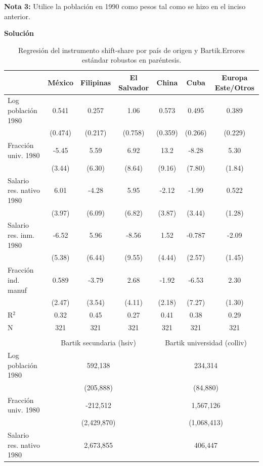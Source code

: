 \documentclass[a4paper, answers, addpoints, 11pt]{exam}
\newenvironment{solucion}{%
  \begin{mdframed}[
    backgroundcolor=blue!5,    %
    linecolor=blue!50,          %
    linewidth=2pt,              %
    leftmargin=10pt,            %
    rightmargin=8pt,           %
    topline=true,              %
    bottomline=true,            %
    roundcorner=10pt,           %
    innerleftmargin=10pt,       %
    innerrightmargin=10pt,      %
    innerbottommargin=10pt,     %
    innertopmargin=10pt         %
  ]%
  \begin{tcolorbox}[colframe=blue!50!black, colback=blue!50, coltitle=white, sharp corners=all, boxrule=1mm, width=\textwidth, halign=left, valign=center, top=0mm, bottom=0mm, left=0mm, right=0mm] \textbf{Solución} \end{tcolorbox} }{\end{mdframed}}
\begin{document}
\begin{itemize}
   \textbf{Nota 3:} Utilice la población en 1990 como pesos tal como se hizo en el inciso anterior. 
  \begin{solucion}
\begin{table}[H]
\centering
\small
\caption{Regresión del instrumento shift-share por país de origen y Bartik.Errores estándar robustos en paréntesis.}
\label{tab:shric_regs_all}
\begin{tabular}{lcccccc}
\toprule
 & México & Filipinas & El Salvador & China & Cuba & Europa Este/Otros \\
\midrule
Log población 1980 & 0.541 & 0.257 & 1.06 & 0.573 & 0.495 & 0.389 \\
 & (0.474) & (0.217) & (0.758) & (0.359) & (0.266) & (0.229) \\
Fracción univ. 1980 & -5.45 & 5.59 & 6.92 & 13.2 & -8.28 & 5.30 \\
 & (3.44) & (6.30) & (8.64) & (9.16) & (7.80) & (1.84) \\
Salario res. nativo 1980 & 6.01 & -4.28 & 5.95 & -2.12 & -1.99 & 0.522 \\
 & (3.97) & (6.09) & (6.82) & (3.87) & (3.44) & (1.28) \\
Salario res. inm. 1980 & -6.52 & 5.96 & -8.56 & 1.52 & -0.787 & -2.09 \\
 & (5.38) & (6.44) & (9.55) & (4.44) & (2.57) & (1.45) \\
Fracción ind. manuf & 0.589 & -3.79 & 2.68 & -1.92 & -6.53 & 2.30 \\
 & (2.47) & (3.54) & (4.11) & (2.18) & (7.27) & (1.30) \\
\midrule
R$^2$ & 0.32 & 0.45 & 0.27 & 0.41 & 0.38 & 0.29 \\
N & 321 & 321 & 321 & 321 & 321 & 321 \\
\midrule
\multicolumn{7}{l}{} \\
\midrule
 & \multicolumn{3}{c}{Bartik secundaria (hsiv)} & \multicolumn{3}{c}{Bartik universidad (colliv)} \\
\cmidrule(lr){1-7} %
Log población 1980 & \multicolumn{3}{c}{592,138} & \multicolumn{3}{c}{234,314} \\
 & \multicolumn{3}{c}{(205,888)} & \multicolumn{3}{c}{(84,880)} \\
Fracción univ. 1980 & \multicolumn{3}{c}{-212,512} & \multicolumn{3}{c}{1,567,126} \\
 & \multicolumn{3}{c}{(2,429,870)} & \multicolumn{3}{c}{(1,068,413)} \\
Salario res. nativo 1980 & \multicolumn{3}{c}{2,673,855} & \multicolumn{3}{c}{406,447} \\

\end{tabular}
\end{table}
\end{solucion}
\end{itemize}
\end{document}
